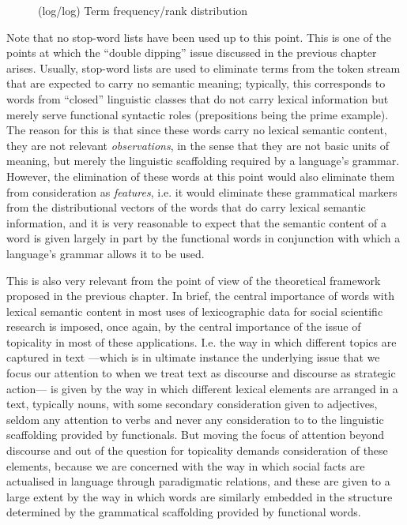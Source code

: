 \begin{figure}
    \centerfloat
    
    \caption{(log/log) Term frequency/rank distribution}
    \label{fig:freqrank}
\end{figure}

Note that no stop-word lists have been used up to this point.
This is one of the points at which the ``double dipping'' issue discussed in the previous chapter arises.
Usually, stop-word lists are used to eliminate terms from the token stream that are expected to carry no semantic meaning; typically, this corresponds to words from ``closed'' linguistic classes that do not carry lexical information but merely serve functional syntactic roles (prepositions being the prime example).
The reason for this is that since these words carry no lexical semantic content, they are not relevant \emph{observations}, in the sense that they are not basic units of meaning, but merely the linguistic scaffolding required by a language's grammar.
However, the elimination of these words at this point would also eliminate them from consideration as \emph{features}, i.e. it would eliminate these grammatical markers from the distributional vectors of the words that do carry lexical semantic information, and it is very reasonable to expect that the semantic content of a word is given largely in part by the functional words in conjunction with which a language's grammar allows it to be used.

This is also very relevant from the point of view of the theoretical framework proposed in the previous chapter.
In brief, the central importance of words with lexical semantic content in most uses of lexicographic data for social scientific research is imposed, once again, by the central importance of the issue of topicality in most of these applications.
I.e. the way in which different topics are captured in text ---which is in ultimate instance the underlying issue that we focus our attention to when we treat text as discourse and discourse as strategic action--- is given by the way in which different lexical elements are arranged in a text, typically nouns, with some secondary consideration given to adjectives, seldom any attention to verbs and never any consideration to to the linguistic scaffolding provided by functionals.
But moving the focus of attention beyond discourse and out of the question for topicality demands consideration of these elements, because we are concerned with the way in which social facts are actualised in language through paradigmatic relations, and these are given to a large extent by the way in which words are similarly embedded in the structure determined by the grammatical scaffolding provided by functional words.

